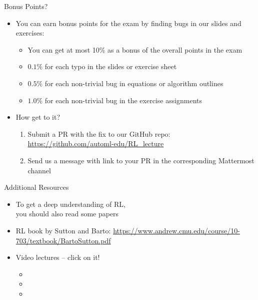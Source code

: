 \begin{frame}[c]{Bonus Points?}
	
	\begin{itemize}
		\item You can earn bonus points for the exam by finding bugs in our slides and exercises:
		\begin{itemize}
			\item You can get at most 10\% as a bonus of the overall points in the exam
			\item $0.1\%$ for each typo in the slides or exercise sheet
			\item $0.5\%$ for each non-trivial bug in equations or algorithm outlines
			\item $1.0\%$ for each non-trivial bug in the exercise assignments
		\end{itemize}
		\pause
		\item How get to it?
		\begin{enumerate}
			\item Submit a PR with the fix to our GitHub repo: \url{https://github.com/automl-edu/RL_lecture}
			\item Send us a message with link to your PR in the corresponding Mattermost channel
		\end{enumerate}
		
	\end{itemize}
	
\end{frame}
\begin{frame}[c]{Additional Resources}
	
	\begin{itemize}
		\item To get a deep understanding of RL,\\ you should also read some papers 
		\item RL book by Sutton and Barto: 
		\url{https://www.andrew.cmu.edu/course/10-703/textbook/BartoSutton.pdf}
		\item Video lectures -- click on it!
		\begin{itemize}
			\item {}
			\item {}
			\item {}
		\end{itemize}
	\end{itemize}
	
\end{frame}
